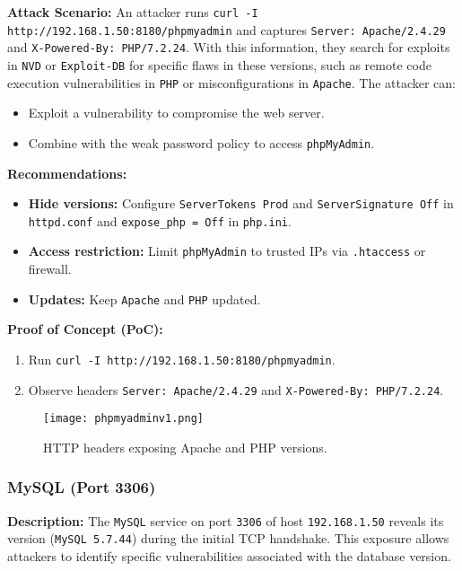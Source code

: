 \documentclass[a4paper,12pt]{article}
\begin{document}
\textbf{Attack Scenario:}  
An attacker runs \texttt{curl -I http://192.168.1.50:8180/phpmyadmin} and captures \texttt{Server: Apache/2.4.29} and \texttt{X-Powered-By: PHP/7.2.24}. With this information, they search for exploits in \texttt{NVD} or \texttt{Exploit-DB} for specific flaws in these versions, such as remote code execution vulnerabilities in \texttt{PHP} or misconfigurations in \texttt{Apache}. The attacker can:  
\begin{itemize}
    \item Exploit a vulnerability to compromise the web server.  
    \item Combine with the weak password policy to access \texttt{phpMyAdmin}.  
\end{itemize}

\textbf{Recommendations:}  
\begin{itemize}
    \item \textbf{Hide versions:} Configure \texttt{ServerTokens Prod} and \texttt{ServerSignature Off} in \texttt{httpd.conf} and \texttt{expose\_php = Off} in \texttt{php.ini}.  
    \item \textbf{Access restriction:} Limit \texttt{phpMyAdmin} to trusted IPs via \texttt{.htaccess} or firewall.  
    \item \textbf{Updates:} Keep \texttt{Apache} and \texttt{PHP} updated.  
\end{itemize}

\textbf{Proof of Concept (PoC):}  
\begin{enumerate}
    \item Run \texttt{curl -I http://192.168.1.50:8180/phpmyadmin}.  
    \item Observe headers \texttt{Server: Apache/2.4.29} and \texttt{X-Powered-By: PHP/7.2.24}.  
\end{enumerate}

\begin{figure}[ht]
    \centering
    \texttt{[image: phpmyadminv1.png]}
    \caption{HTTP headers exposing Apache and PHP versions.}
\end{figure}

\clearpage

\subsubsection{MySQL (Port 3306)}
\textbf{Description:}  
The \texttt{MySQL} service on port \texttt{3306} of host \texttt{192.168.1.50} reveals its version (\texttt{MySQL 5.7.44}) during the initial TCP handshake. This exposure allows attackers to identify specific vulnerabilities associated with the database version.
\end{document}
